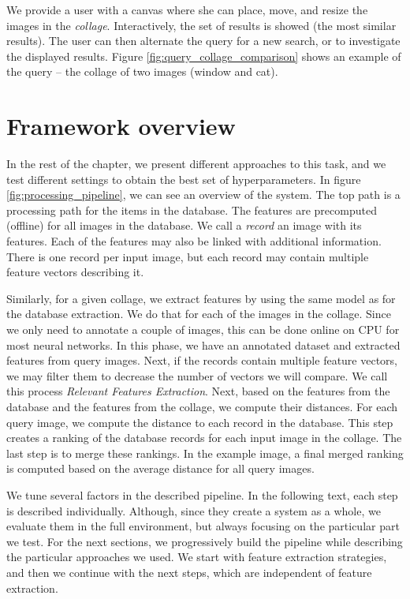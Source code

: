 We provide a user with a canvas where she can place, move, and resize the images in the \emph{collage}. Interactively, the set of results is showed (the most similar results). The user can then alternate the query for a new search, or to investigate the displayed results. Figure \ref{fig:query_collage_comparison} shows an example of the query -- the collage of two images (window and cat). 

\section{Framework overview}

In the rest of the chapter, we present different approaches to this task, and we test different settings to obtain the best set of hyperparameters. In figure \ref{fig:processing_pipeline}, we can see an overview of the system. The top path is a processing path for the items in the database. The features are precomputed (offline) for all images in the database. We call a \emph{record} an image with its features. Each of the features may also be linked with additional information. There is one record per input image, but each record may contain multiple feature vectors describing it.

Similarly, for a given collage, we extract features by using the same model as for the database extraction. We do that for each of the images in the collage. Since we only need to annotate a couple of images, this can be done online on CPU for most neural networks. In this phase, we have an annotated dataset and extracted features from query images. Next, if the records contain multiple feature vectors, we may filter them to decrease the number of vectors we will compare. We call this process \emph{Relevant Features Extraction}. Next, based on the features from the database and the features from the collage, we compute their distances. For each query image, we compute the distance to each record in the database. This step creates a ranking of the database records for each input image in the collage. The last step is to merge these rankings. In the example image, a final merged ranking is computed based on the average distance for all query images.

We tune several factors in the described pipeline. In the following text, each step is described individually. Although, since they create a system as a whole, we evaluate them in the full environment, but always focusing on the particular part we test. For the next sections, we progressively build the pipeline while describing the particular approaches we used. We start with feature extraction strategies, and then we continue with the next steps, which are independent of feature extraction.

